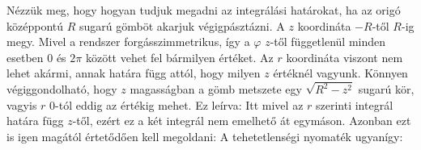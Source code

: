  Nézzük meg, hogy hogyan tudjuk megadni az integrálási határokat, ha az origó középpontú $R$ sugarú gömböt akarjuk végigpásztázni. A $z$ koordináta $-R$-től $R$-ig megy. Mivel a rendszer forgásszimmetrikus, így a $\varphi$ $z$-től függetlenül minden esetben $0$ és $2\pi$ között vehet fel bármilyen értéket. Az $r$ koordináta viszont nem lehet akármi, annak határa függ attól, hogy milyen $z$ értéknél vagyunk. Könnyen végiggondolható, hogy $z$ magasságban a gömb metszete egy $\sqrt{R^2-z^2}$ sugarú kör, vagyis $r$ 0-tól eddig az értékig mehet. Ez leírva:
 Itt mivel az $r$ szerinti integrál határa függ $z$-től, ezért ez a két integrál nem emelhető át egymáson. Azonban ezt is igen magától értetődően kell megoldani:
 A tehetetlenségi nyomaték ugyanígy:
 
